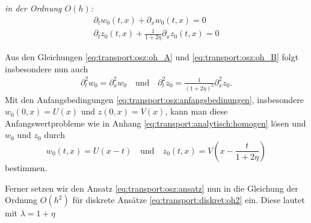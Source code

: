 \noindent \emph{in der Ordnung $O(h)$:}
\begin{align}
\partial_t w_0(t, x) + \partial_x w_0(t, x) = 0 \label{eq:transport:osz:oh_A}\\
\partial_t z_0(t, x) + \frac {1} {1 + 2\eta} \partial_x z_0(t, x) = 0 \label{eq:transport:osz:oh_B}
\end{align}

Aus den Gleichungen \eqref{eq:transport:osz:oh_A} und \eqref{eq:transport:osz:oh_B} folgt insbesondere nun auch
\begin{align}\label{alt:abl2}
\partial^2_t w_0 = \partial^2_x w_0 \quad \text{und} \quad \partial^2_t z_0 = \frac {1}{(1 + 2 \eta)^2} \partial^2_x z_0.
\end{align}
Mit den Anfangsbedingungen \eqref{eq:transport:osz:anfangsbedinungen}, insbesondere $w_0(0, x) = U(x)$ und $z(0, x) = V(x)$, kann man diese Anfangswertprobleme wie in Anhang \ref{eq:transport:analytisch:homogen} lösen und $w_0$ und $z_0$ durch
\[ w_0(t,x) = U(x-t) \quad \text{und} \quad z_0(t,x) = V\left( x - \frac{t}{1 + 2 \eta} \right) \]
bestimmen.

Ferner setzen wir den Ansatz \eqref{eq:transport:osz:ansatz} nun in die Gleichung der Ordnung $O(h^2)$ für diskrete Ansätze \eqref{eq:transport:diskret:oh2} ein.
Diese lautet mit $\lambda = 1 + \eta$

